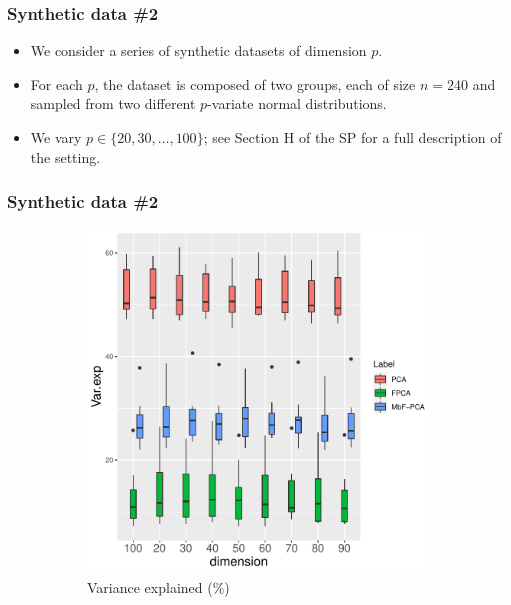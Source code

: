 \documentclass{beamer}
\begin{document}
\begin{frame}
	\frametitle{Synthetic data \#2}
	\begin{itemize}
		\item We consider a series of synthetic datasets of dimension $p$.
		
		\item For each $p$, the dataset is composed of two groups, each of size $n=240$ and sampled from two different $p$-variate normal distributions.
		
		\item We vary $p \in \{20, 30, \dots, 100\}$; see Section H of the SP \cite{Lee21} for a full description of the setting.
	\end{itemize}
\end{frame}

\begin{frame}
	\frametitle{Synthetic data \#2}
	\begin{figure}[!t]
		\begin{center}
			\begin{subfigure}[t]{0.49\columnwidth}
				\includegraphics[width=\linewidth]{figures/exp1-2/varexp.pdf}
				\caption{\label{fig:varexp} Variance explained (\%)}
			\end{subfigure}
			\begin{subfigure}[t]{0.49\columnwidth}	

\end{subfigure}
\end{center}
\end{figure}
\end{frame}
\end{document}
